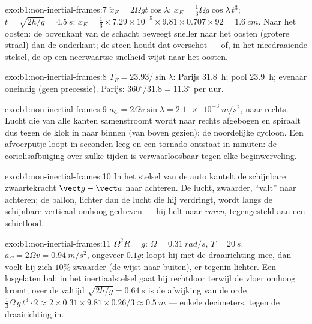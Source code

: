 \begin{solution}{exo:b1:non-inertial-frames:7}
$\ddot x_E = 2\Omega gt\cos\lambda$: $x_E = \tfrac13\Omega g\cos\lambda\,t^3$; $t =
\sqrt{2h/g} = \qty{4.5}{s}$: $x_E = \tfrac13 \times 7.29\times10^{-5} \times 9.81
\times 0.707 \times 92 = \qty{1.6}{cm}$. Naar het oosten: de bovenkant van de schacht
beweegt sneller naar het oosten (grotere straal) dan de onderkant; de steen houdt dat
overschot --- of, in het meedraaiende stelsel, de  op een neerwaartse
snelheid wijst naar het oosten.
\end{solution}

\begin{solution}{exo:b1:non-inertial-frames:8}
$T_F = 23.93/\sin\lambda$: Parijs \qty{31.8}{h}; pool \qty{23.9}{h}; evenaar
oneindig (geen precessie). Parijs: $360^\circ/31.8 = 11.3^\circ$ per uur.
\end{solution}

\begin{solution}{exo:b1:non-inertial-frames:9}
$a_C = 2\Omega v\sin\lambda = \qty{2.1e-3}{m/s^2}$, naar rechts. Lucht die
van alle kanten samenstroomt wordt naar rechts afgebogen en spiraalt dus
tegen de klok in naar binnen (van boven gezien): de noordelijke cycloon. Een afvoerputje
loopt in seconden leeg en een tornado ontstaat in minuten: de coriolisafbuiging over
zulke tijden is verwaarloosbaar tegen elke beginwerveling.
\end{solution}

\begin{solution}{exo:b1:non-inertial-frames:10}
In het stelsel van de auto kantelt de schijnbare zwaartekracht $\vect g - \vect a$ naar achteren.
De lucht, zwaarder, ``valt'' naar achteren; de ballon, lichter dan de lucht die hij
verdringt, wordt langs de schijnbare verticaal omhoog gedreven --- hij helt naar \emph{voren},
tegengesteld aan een schietlood.
\end{solution}

\begin{solution}{exo:b1:non-inertial-frames:11}
$\Omega^2R = g$: $\Omega = \qty{0.31}{rad/s}$, $T = \qty{20}{s}$. $a_C = 2\Omega v
= \qty{0.94}{m/s^2}$, ongeveer $0.1g$: loopt hij met de draairichting mee, dan voelt hij
zich $10\%$ zwaarder (de  wijst naar buiten), er tegenin
lichter. Een losgelaten bal: in het inertiaalstelsel gaat hij rechtdoor terwijl
de vloer omhoog kromt; over de valtijd $\sqrt{2h/g} = \qty{0.64}{s}$ is de
afwijking van de orde $\tfrac13\Omega\,g\,t^3 \cdot 2 \approx 2 \times 0.31 \times
9.81 \times 0.26/3 \approx \qty{0.5}{m}$ --- enkele decimeters, tegen de
draairichting in.
\end{solution}

